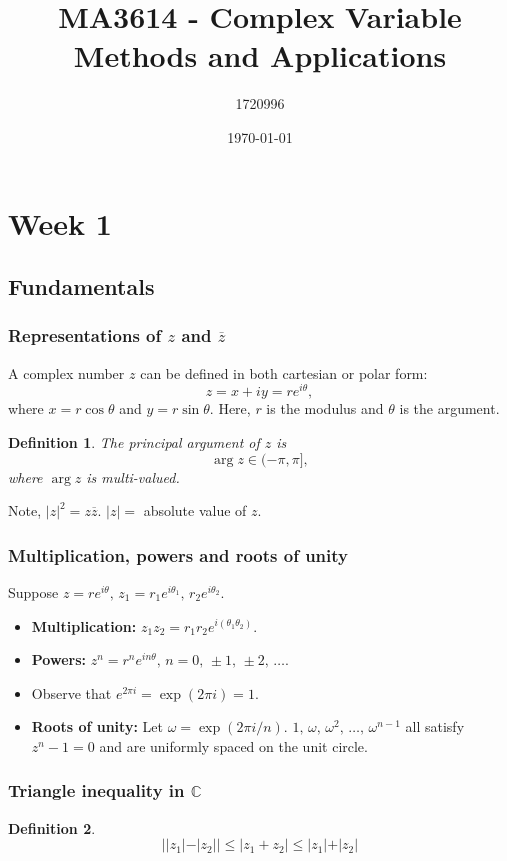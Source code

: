 \documentclass{article}
\title{MA3614 - Complex Variable Methods and Applications}
\author{1720996}
\date{\today}
\newtheorem{definition}{Definition}
\begin{document}
\maketitle

\tableofcontents

\section{Week 1}
\subsection{Fundamentals}
\subsubsection{Representations of $z$ and $\overline{z}$}
A complex number $z$ can be defined in both cartesian or polar form:
\begin{equation}
    z = x+iy=re^{i\theta},
\end{equation}
where $x=r\cos\theta$ and $y=r\sin\theta$. Here, $r$ is the modulus and $\theta$ is the argument. 
\begin{definition}
The principal argument of $z$ is
    \begin{equation}
        \arg z\in(-\pi,\pi],
    \end{equation}
    where $\arg z$ is multi-valued.
\end{definition}
Note, $\vert z\vert^2 = z\overline{z}$. $\vert z\vert=$ absolute value of $z$.

\subsubsection{Multiplication, powers and roots of unity}
Suppose $z=re^{i\theta},\,z_1 = r_1e^{i\theta_1},\,r_2e^{i\theta_2}$.
\begin{itemize}
    \item \textbf{Multiplication:} $z_1 z_2 = r_1 r_2 e^{i(\theta_1\theta_2)}$.
    \item \textbf{Powers:} $z^n=r^n e^{in\theta},\,n=0,\,\pm1,\,\pm2,\,\ldots$.
    \item Observe that $e^{2\pi i}=\exp(2\pi i) = 1$.
    \item \textbf{Roots of unity:} Let $\omega = \exp(2\pi i/n)$. $1,\,\omega,\,\omega^2,\,\ldots,\,\omega^{n-1}$ all satisfy $z^n-1=0$ and are uniformly spaced on the unit circle.
\end{itemize}
\subsubsection{Triangle inequality in $\mathbb{C}$}
\begin{definition}
    \begin{equation}
        \vert \vert z_1\vert - \vert z_2 \vert \vert \leq  \vert z_1 +z_2 \vert \leq \vert z_1\vert + \vert z_2 \vert
    \end{equation}
\end{definition}
\end{document}
